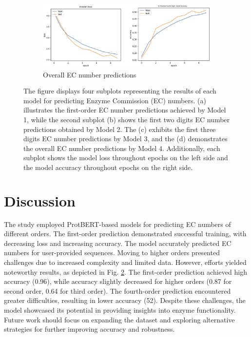 \documentclass[conference]{IEEEtran}
\begin{document}
\begin{figure}[ht]
  \vspace{0.5cm}

  \begin{subfigure}{0.7\linewidth}
    \includegraphics[width=\linewidth]{images/EC4_Results.png}
    \caption{Overall EC number predictions}
    \label{fig:subfig4}
  \end{subfigure}

  \caption{The figure displays four subplots representing the results of each model for predicting Enzyme Commission (EC) numbers. (a) illustrates the first-order EC number predictions achieved by Model 1, while the second subplot (b) shows the first two digits EC number predictions obtained by Model 2. The (c) exhibits the first three digits EC number predictions by Model 3, and the (d) demonstrates the overall EC number predictions by Model 4. Additionally, each subplot shows the model loss throughout epochs on the left side and the model accuracy throughout epochs on the right side.}
  \label{fig:results}
\end{figure}


\twocolumn



\section{Discussion}

The study employed ProtBERT-based models for predicting EC numbers of different
orders. The first-order prediction demonstrated successful training, with decreasing loss
and increasing accuracy. The model accurately predicted EC numbers for user-provided
sequences. Moving to higher orders presented challenges due to increased complexity
and limited data. However, efforts yielded noteworthy results, as depicted in Fig. \ref{fig:results}. The
first-order prediction achieved high accuracy (0.96), while accuracy slightly decreased
for higher orders (0.87 for second order, 0.64 for third order). The fourth-order prediction encountered greater difficulties, resulting in lower accuracy (52). Despite these challenges, the model showcased its potential in providing insights into enzyme functionality. Future work should focus on expanding the dataset and exploring alternative strategies for further improving accuracy and robustness.
\end{document}
